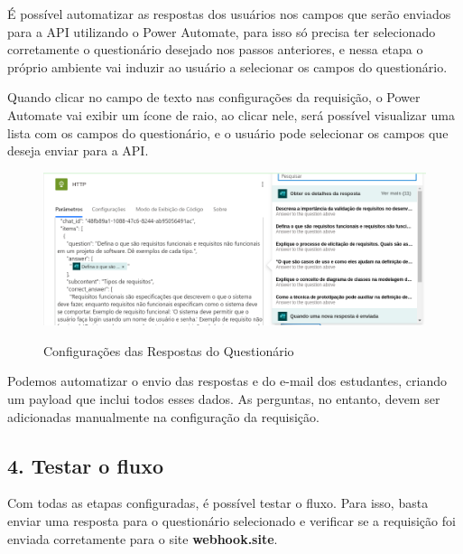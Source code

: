 É possível automatizar as respostas dos usuários nos campos que serão enviados para a API utilizando o Power Automate, para isso só precisa ter selecionado corretamente o questionário desejado nos passos anteriores, e nessa etapa o próprio ambiente vai induzir ao usuário a selecionar os campos do questionário. 

Quando clicar no campo de texto nas configurações da requisição, o Power Automate vai exibir um ícone de raio, ao clicar nele, será possível visualizar uma lista com os campos do questionário, e o usuário pode selecionar os campos que deseja enviar para a API.

\begin{figure}[H]
    \centering
    \caption{Configurações das Respostas do Questionário}
    \includegraphics[width=1\textwidth]{figuras/mpa_example.png}
    \label{fig:report_questions}
\end{figure}

Podemos automatizar o envio das respostas e do e-mail dos estudantes, criando um payload que inclui todos esses dados. As perguntas, no entanto, devem ser adicionadas manualmente na configuração da requisição.

\subsection*{4. Testar o fluxo}

Com todas as etapas configuradas, é possível testar o fluxo. Para isso, basta enviar uma resposta para o questionário selecionado e verificar se a requisição foi enviada corretamente para o site \textbf{webhook.site}.


